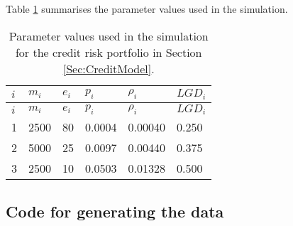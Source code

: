 \documentclass[
]{article}
\begin{document}
Table \ref{tab:credit} summarises the parameter values used in the simulation.

\begin{longtable}[]{@{}llllll@{}}
\caption{\label{tab:credit} Parameter values used in the simulation for the credit risk portfolio in Section \ref{Sec:CreditModel}.}\tabularnewline
\toprule
\(i\) & \(m_i\) & \(e_i\) & \(p_i\) & \(\rho_i\) & \(LGD_i\)\tabularnewline
\midrule
\endfirsthead
\toprule
\(i\) & \(m_i\) & \(e_i\) & \(p_i\) & \(\rho_i\) & \(LGD_i\)\tabularnewline
\midrule
\endhead
1 & 2500 & 80 & 0.0004 & 0.00040 & 0.250\tabularnewline
2 & 5000 & 25 & 0.0097 & 0.00440 & 0.375\tabularnewline
3 & 2500 & 10 & 0.0503 & 0.01328 & 0.500\tabularnewline
\bottomrule
\end{longtable}

\hypertarget{code-for-generating-the-data}{%
\subsection{Code for generating the data}\label{code-for-generating-the-data}}
\end{document}
